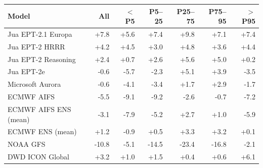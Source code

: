 \begin{tabular}{lrrrrrr}
\toprule
Model & All & $<$P5 & P5--25 & P25--75 & P75--95 & $>$P95 \\
\midrule
Jua EPT-2.1 Europa & +7.8 & +5.6 & +7.4 & +9.8 & +7.1 & +7.4 \\
Jua EPT-2 HRRR & +4.2 & +4.5 & +3.0 & +4.8 & +3.6 & +4.4 \\
Jua EPT-2 Reasoning & +2.4 & +0.7 & +2.6 & +5.6 & +5.0 & +0.2 \\
Jua EPT-2e & -0.6 & -5.7 & -2.3 & +5.1 & +3.9 & -3.5 \\
Microsoft Aurora & -0.6 & -4.1 & -3.4 & +1.7 & +2.9 & -1.7 \\
ECMWF AIFS & -5.5 & -9.1 & -9.2 & -2.6 & -0.7 & -7.2 \\
ECMWF AIFS ENS (mean) & -3.1 & -7.9 & -5.2 & +2.7 & +1.0 & -5.9 \\
ECMWF ENS (mean) & +1.2 & -0.9 & +0.5 & +3.3 & +3.2 & +0.1 \\
NOAA GFS & -10.8 & -5.1 & -14.5 & -23.4 & -16.8 & -2.1 \\
DWD ICON Global & +3.2 & +1.0 & +1.5 & +0.4 & +0.6 & +6.1 \\
\bottomrule
\end{tabular}
